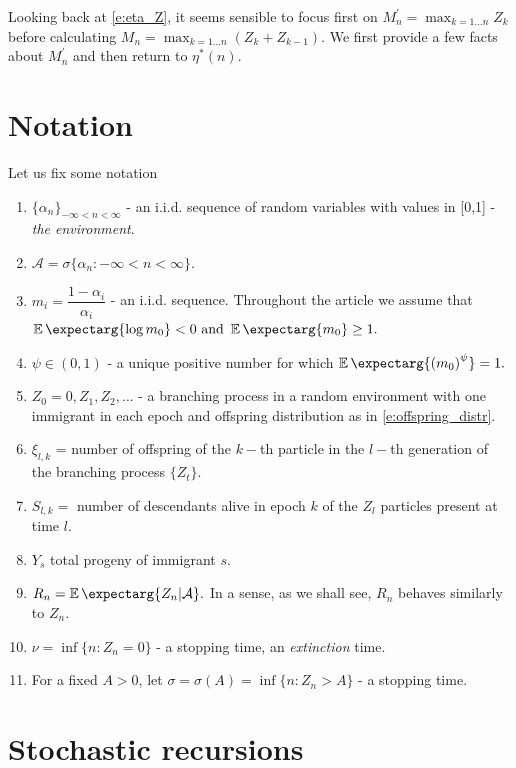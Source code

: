 \documentclass[12pt]{article}
\newcommand{\env}{\mathcal{A}}
\newcommand{\expect}{\operatorname{\mathbb{E}}\expectarg}
\begin{document}
\bigskip

Looking back at \eqref{e:eta_Z}, it seems sensible to focus first on $ M_n^\prime = \max_{k=1 \dots n}Z_k$ before calculating $M_n = \max_{k=1 \dots n}(Z_k + Z_{k-1}).$ We first provide a few facts about $M_n^\prime$ and then return to $\eta^*(n).$


\section{Notation}
Let us fix some notation
\begin{enumerate}
    \item $\{ \alpha_n \}_{-\infty < n < \infty }$ - an i.i.d. sequence of random variables with values in [0,1] - \textit{the environment}. 
    \item $\env  = \sigma\{ \alpha_n : -\infty < n < \infty \}.$
    \item $m_i = \dfrac{1-\alpha_i}{\alpha_i}$ - an i.i.d. sequence. Throughout the article we assume that $\expect{\log m_0} < 0 \text{ and } \expect {m_0} \geq 1.$
    \item $\psi \in (0, 1)$ - a unique positive number for which $\expect{\left( m_0 \right)^\psi } = 1.$
    \item $Z_0 = 0, Z_1, Z_2, \dots$ - a branching process in a random environment with one immigrant in each epoch and offspring distribution as in \eqref{e:offspring_distr}. 
    \item $\xi_{l,k}$ = number of offspring of the $k-$th particle in the $l-$th generation of the branching process $\{Z_t\}.$
    \item $S_{l,k} = $ number of descendants alive in epoch $k$ of the $Z_l$ particles present at time $l$.
    \item $Y_s$ total progeny of immigrant $s$.
    \item $R_n  = \expect{Z_n | \env}.$ In a sense, as we shall see, $R_n$ behaves similarly to $Z_n$.
    \item $\nu = \inf \{n : Z_n = 0\}$ - a stopping time, an \textit{extinction} time.
    \item For a fixed $A>0$, let $\sigma = \sigma (A) = \inf \{ n : Z_n > A\}$ - a stopping time. 
\end{enumerate}
    

\section{Stochastic recursions}
\end{document}
